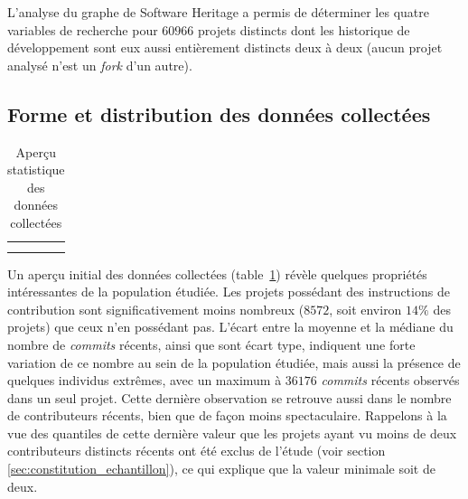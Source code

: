 \documentclass[dvipsnames]{llncs}
\newcommand{\en}[1]{\foreignlanguage{english}{\emph{#1}}}
\begin{document}
    L'analyse du graphe de Software Heritage a permis de déterminer les quatre variables de recherche pour
    $60 966$ projets distincts dont les historique de développement sont eux aussi entièrement distincts deux
    à deux (aucun projet analysé n'est un \en{fork} d'un autre).

    \subsection{Forme et distribution des données collectées}

    \begin{table}[ht]
        \centering
        \begin{tabular}{c|c}
             &
            \\
            \hline
            \\
             &
            
        \end{tabular}
        \caption{Aperçu statistique des données collectées}
        \label{tab:data_description}
    \end{table}

    Un aperçu initial des données collectées (table~\ref{tab:data_description}) révèle quelques propriétés
    intéressantes de la population étudiée. Les projets possédant des instructions de contribution sont
    significativement moins nombreux ($8 572$, soit environ $14\%$ des projets) que ceux n'en possédant pas.
    L'écart entre la moyenne et la médiane du nombre de \en{commits} récents, ainsi que sont écart type,
    indiquent une forte variation de ce nombre au sein de la population étudiée, mais aussi la présence de
    quelques individus extrêmes, avec un maximum à $36 176$ \en{commits} récents observés dans un seul projet.
    Cette dernière observation se retrouve aussi dans le nombre de contributeurs récents, bien que de façon
    moins spectaculaire. Rappelons à la vue des quantiles de cette dernière valeur que les projets ayant vu
    moins de deux contributeurs distincts récents ont été exclus de l'étude (voir section
    \ref{sec:constitution_echantillon}), ce qui explique que la valeur minimale soit de deux.
\end{document}
